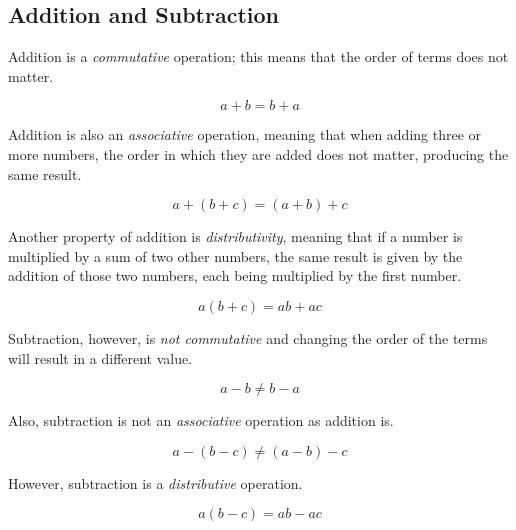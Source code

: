 \documentclass[a5paper,9pt]{book}
\theoremstyle{definition}
\begin{document}
            \subsection{Addition and Subtraction}

                Addition is a \emph{commutative} operation; this means that the order
                of terms does not matter.

                \begin{equation*}
                    a + b = b + a
                \end{equation*}

                Addition is also an \emph{associative} operation, meaning that when adding
                three or more numbers, the order in which they are added does not matter,
                producing the same result.

                \begin{equation*}
                    a + (b + c) = (a + b) + c
                \end{equation*}

                Another property of addition is \emph{distributivity}, meaning that if
                a number is multiplied by a sum of two other numbers, the same result is
                given by the addition of those two numbers, each being multiplied by the
                first number.

                \begin{equation*}
                    a(b + c) = ab + ac
                \end{equation*}

                Subtraction, however, is \emph{not commutative} and changing the order of the
                terms will result in a different value.

                \begin{equation*}
                    a - b \neq b - a
                \end{equation*}

                Also, subtraction is not an \emph{associative} operation as addition is.

                \begin{equation*}
                    a-(b-c) \neq (a-b)-c
                \end{equation*}

                However, subtraction is a \emph{distributive} operation.

                \begin{equation*}
                    a(b-c) = ab - ac
                \end{equation*}
\end{document}
